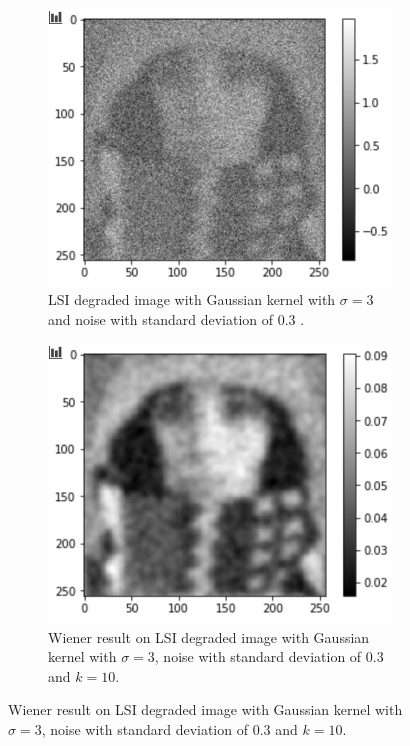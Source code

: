 \begin{figure}[H]
	\centering
	\begin{subfigure}[b]{0.45\linewidth}
		\centering
		\includegraphics[width=\linewidth]{Materials/E5/w5before}
		\caption{LSI degraded image with Gaussian kernel with $\sigma = 3$ and noise with standard deviation of $0.3$ .}
	\end{subfigure}
	\hfill
	\begin{subfigure}[b]{0.45\linewidth}
		\centering
		\includegraphics[width=\linewidth]{Materials/E5/w5after}
		\caption{Wiener result on LSI degraded image with Gaussian kernel with $\sigma = 3$, noise with standard deviation of $0.3$ and $k = 10$.}

\end{subfigure}
\end{figure}
